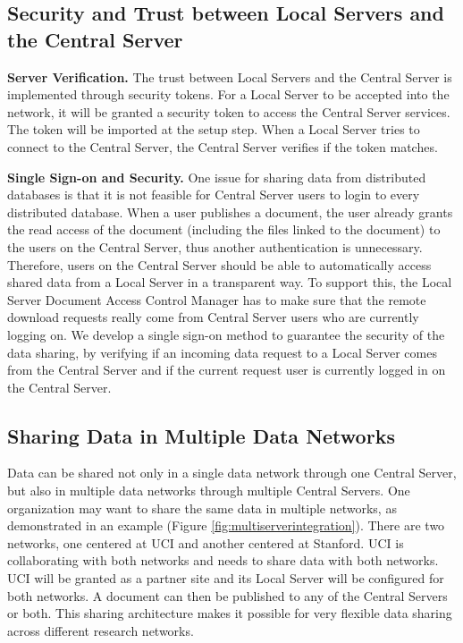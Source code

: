 \documentclass{doublecol-new}
\theoremstyle{TH}{
\newtheorem{lemma}{Lemma}
\newtheorem{theorem}[lemma]{Theorem}
\newtheorem{corrolary}[lemma]{Corrolary}
\newtheorem{conjecture}[lemma]{Conjecture}
\newtheorem{proposition}[lemma]{Proposition}
\newtheorem{claim}[lemma]{Claim}
\newtheorem{stheorem}[lemma]{Wrong Theorem}
\newtheorem{algorithm}{Algorithm}
}
\theoremstyle{THrm}{
\newtheorem{definition}{Definition}[section]
\newtheorem{question}{Question}[section]
\newtheorem{remark}{Remark}
\newtheorem{scheme}{Scheme}
}
\theoremstyle{THhit}{
\newtheorem{case}{Case}[section]
}
\begin{document}



\subsection{Security and Trust between Local Servers and the Central Server}

\textbf{Server Verification.} The trust between Local Servers and
the Central Server is implemented through security tokens. For a
Local Server to be accepted into the network, it will be granted a
security token to access the Central Server services. The token will
be imported at the setup step. When a Local Server tries to connect
to the Central Server, the Central Server verifies if the token
matches.


\textbf{Single Sign-on and Security.} One issue for sharing data
from distributed databases is that it is not feasible for Central
Server users to login to every distributed database. When a user
publishes a document, the user already grants the read access of the
document (including the files linked to the document) to the users
on the Central Server, thus another authentication is unnecessary.
Therefore, users on the Central Server should be able to
automatically access shared data from a Local Server in a
transparent way. To support this, the Local Server Document Access
Control Manager has to make sure that the remote download requests
really come from Central Server users who are currently logging on.
We develop a single sign-on method to guarantee the security of the
data sharing, by verifying if an incoming data request to a Local
Server comes from the Central Server and if the current request user
is currently logged in on the Central Server.



\subsection{Sharing Data in Multiple Data Networks}

Data can  be shared not only in a single data network through one
Central Server, but also in multiple data networks through multiple
Central Servers. One organization may want to share the same data in
multiple networks, as demonstrated in an example (Figure
\ref{fig:multiserverintegration}).  There are two networks,  one
centered at UCI and another centered at Stanford. UCI is
collaborating with both networks and needs to share data with both
networks.  UCI will be granted as a partner site and its Local
Server will be configured for both networks. A document can then be
published to any of the Central Servers or both.  This sharing
architecture makes it possible for very flexible data sharing across
different research networks.
\end{document}

